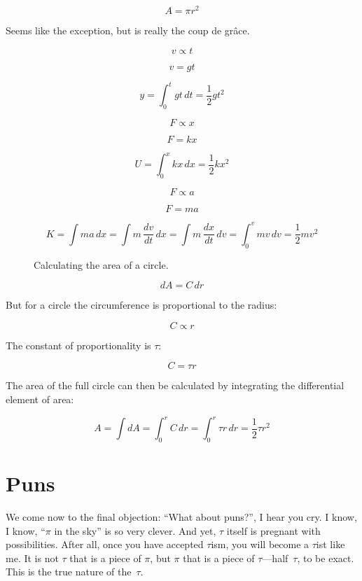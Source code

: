 \documentclass{article}
\begin{document}
\[ A = \pi r^2 \]


Seems like the exception, but is really the coup de gr\^{a}ce.

\[ v \propto t \]

\[ v = g t \]

\[ y = \int_0^t gt\,dt = \textstyle{\frac{1}{2}} gt^2 \]


\[ F \propto x \]

\[ F = k x \]

\[ U = \int_0^x kx\,dx = \textstyle{\frac{1}{2}} kx^2 \]

\[ F \propto a \]

\[ F = m a \]

\[ K = \int ma\,dx = \int m\,\frac{dv}{dt}\,dx = \int m\, \frac{dx}{dt}\,dv = \int_0^v mv\,dv = \textstyle{\frac{1}{2}} mv^2 \]


\begin{figure}
\begin{center}
\end{center}
\caption{Calculating the area of a circle.\label{fig:circular-area}}
\end{figure}

\[ dA = C\,dr \]

\noindent But for a circle the circumference is proportional to the radius:

\[ C \propto r \]

\noindent The constant of proportionality is $\tau$:

\[ C = \tau r \]

\noindent The area of the full circle can then be calculated by integrating the differential element of area:

\[ A = \int dA = \int_0^r C\,dr = \int_0^r \tau r\,dr = \textstyle{\frac{1}{2}} \tau r^2 \]





\section{Puns}

We come now to the final objection: ``What about puns?'', I hear you cry. I know, I know, ``$\pi$ in the sky'' is so very clever. And yet, $\tau$ itself is pregnant with possibilities. After all, once you have accepted $\tau$ism, you will become a $\tau$ist like me. It is not $\tau$ that is a piece of $\pi$, but $\pi$ that is a piece of $\tau$---half~$\tau$, to be exact. This is the true nature of the~$\tau$.
\end{document}
